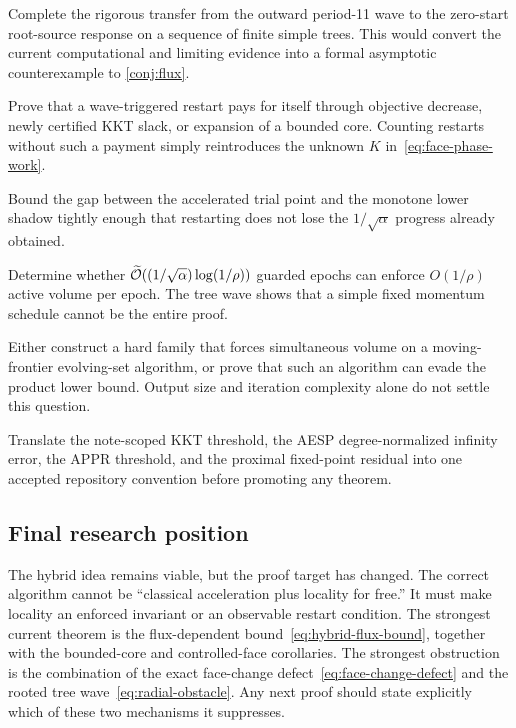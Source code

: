 \begin{description}[style=nextline,leftmargin=3.4cm]
  \item[Finite-tree excitation.] Complete the rigorous transfer from the
  outward period-11 wave to the zero-start root-source response on a sequence
  of finite simple trees.  This would convert the current computational and
  limiting evidence into a formal asymptotic counterexample to
  \cref{conj:flux}.

  \item[Restart amortization.] Prove that a wave-triggered restart pays for
  itself through objective decrease, newly certified KKT slack, or expansion
  of a bounded core.  Counting restarts without such a payment simply
  reintroduces the unknown $K$ in~\eqref{eq:face-phase-work}.

  \item[Lower-shadow accuracy.] Bound the gap between the accelerated trial
  point and the monotone lower shadow tightly enough that restarting does not
  lose the $1/\sqrt\alpha$ progress already obtained.

  \item[Flattened bell.] Determine whether
  $\widetilde{\mathcal{O}}((1/\sqrt\alpha)\log(1/\rho))$ guarded epochs can enforce
  $O(1/\rho)$ active volume per epoch.  The tree wave shows that a simple
  fixed momentum schedule cannot be the entire proof.

  \item[Broader oracle lower bound.] Either construct a hard family that
  forces simultaneous volume on a moving-frontier evolving-set algorithm, or
  prove that such an algorithm can evade the product lower bound.  Output size
  and iteration complexity alone do not settle this question.

  \item[Residual reconciliation.] Translate the note-scoped KKT threshold,
  the AESP degree-normalized infinity error, the APPR threshold, and the
  proximal fixed-point residual into one accepted repository convention before
  promoting any theorem.
\end{description}

\subsection{Final research position}

The hybrid idea remains viable, but the proof target has changed.  The
correct algorithm cannot be ``classical acceleration plus locality for free.''
It must make locality an enforced invariant or an observable restart
condition.  The strongest current theorem is the flux-dependent
bound~\eqref{eq:hybrid-flux-bound}, together with the bounded-core and
controlled-face corollaries.  The strongest obstruction is the combination
of the exact face-change defect~\eqref{eq:face-change-defect} and the rooted
tree wave~\eqref{eq:radial-obstacle}.  Any next proof should state explicitly
which of these two mechanisms it suppresses.
